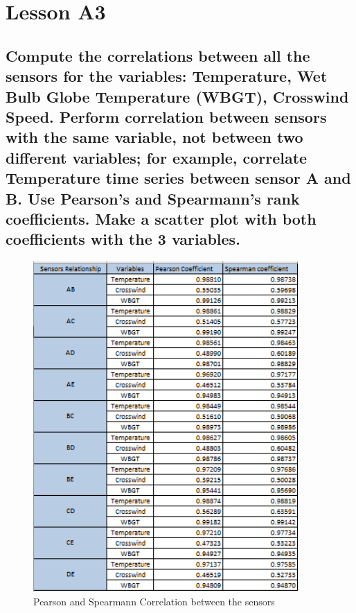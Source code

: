 \documentclass[a4paper,12pt]{article} %
\begin{document}
\section{ Lesson A3}

\subsection{Compute the correlations between all the sensors for the variables: Temperature, Wet Bulb Globe Temperature (WBGT), Crosswind Speed. Perform correlation between sensors with the same variable, not between two different variables; for example, correlate Temperature time series between sensor A and B. Use Pearson’s and Spearmann’s rank coefficients. Make a scatter plot with both coefficients with the 3 variables.}

\begin{figure}[H] %
	\centering %
	\includegraphics[width=0.9\textwidth]{Coefficients.png} 
	\caption{Pearson and Spearmann Correlation between the sensors} %
\end{figure}
\end{document}
